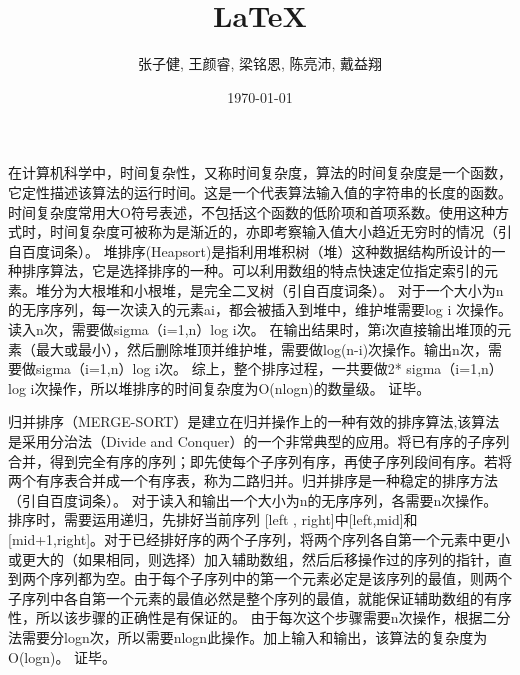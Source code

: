 \documentclass[UTF8]{ctexart}
\title{\LaTeX}
\author{张子健, 王颜睿, 梁铭恩, 陈亮沛, 戴益翔}
\date{\today}
\begin{document}
\maketitle
在计算机科学中，时间复杂性，又称时间复杂度，算法的时间复杂度是一个函数，它定性描述该算法的运行时间。这是一个代表算法输入值的字符串的长度的函数。时间复杂度常用大O符号表述，不包括这个函数的低阶项和首项系数。使用这种方式时，时间复杂度可被称为是渐近的，亦即考察输入值大小趋近无穷时的情况（引自百度词条）。
堆排序(Heapsort)是指利用堆积树（堆）这种数据结构所设计的一种排序算法，它是选择排序的一种。可以利用数组的特点快速定位指定索引的元素。堆分为大根堆和小根堆，是完全二叉树（引自百度词条）。
对于一个大小为n的无序序列，每一次读入的元素ai，都会被插入到堆中，维护堆需要log i 次操作。读入n次，需要做sigma（i=1,n）log i次。
在输出结果时，第i次直接输出堆顶的元素（最大或最小），然后删除堆顶并维护堆，需要做log(n-i)次操作。输出n次，需要做sigma（i=1,n）log i次。
综上，整个排序过程，一共要做2* sigma（i=1,n）log i次操作，所以堆排序的时间复杂度为O(nlogn)的数量级。
证毕。

归并排序（MERGE-SORT）是建立在归并操作上的一种有效的排序算法,该算法是采用分治法（Divide and Conquer）的一个非常典型的应用。将已有序的子序列合并，得到完全有序的序列；即先使每个子序列有序，再使子序列段间有序。若将两个有序表合并成一个有序表，称为二路归并。归并排序是一种稳定的排序方法（引自百度词条）。
对于读入和输出一个大小为n的无序序列，各需要n次操作。
排序时，需要运用递归，先排好当前序列 [left , right]中[left,mid]和[mid+1,right]。对于已经排好序的两个子序列，将两个序列各自第一个元素中更小或更大的（如果相同，则选择）加入辅助数组，然后后移操作过的序列的指针，直到两个序列都为空。由于每个子序列中的第一个元素必定是该序列的最值，则两个子序列中各自第一个元素的最值必然是整个序列的最值，就能保证辅助数组的有序性，所以该步骤的正确性是有保证的。
由于每次这个步骤需要n次操作，根据二分法需要分logn次，所以需要nlogn此操作。加上输入和输出，该算法的复杂度为O(logn)。
证毕。
\end{document}
